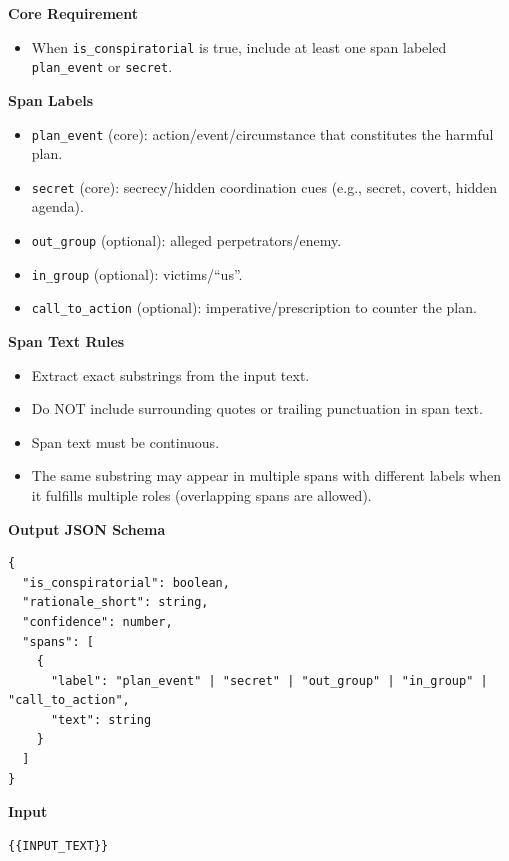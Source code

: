 \vspace{0.5em}
\textbf{Core Requirement}
\begin{itemize}
  \item When \texttt{is\_conspiratorial} is true, include at least one span labeled \texttt{plan\_event} or \texttt{secret}.
\end{itemize}

\vspace{0.5em}
\textbf{Span Labels}
\begin{itemize}
  \item \texttt{plan\_event} (core): action/event/circumstance that constitutes the harmful plan.
  \item \texttt{secret} (core): secrecy/hidden coordination cues (e.g., secret, covert, hidden agenda).
  \item \texttt{out\_group} (optional): alleged perpetrators/enemy.
  \item \texttt{in\_group} (optional): victims/``us''.
  \item \texttt{call\_to\_action} (optional): imperative/prescription to counter the plan.
\end{itemize}

\vspace{0.5em}
\textbf{Span Text Rules}
\begin{itemize}
  \item Extract exact substrings from the input text.
  \item Do NOT include surrounding quotes or trailing punctuation in span text.
  \item Span text must be continuous.
  \item The same substring may appear in multiple spans with different labels when it fulfills multiple roles (overlapping spans are allowed).
\end{itemize}

\vspace{0.5em}
\textbf{Output JSON Schema}
\begin{lstlisting}[style=verbatimstyle]
{
  "is_conspiratorial": boolean,
  "rationale_short": string,
  "confidence": number,
  "spans": [
    {
      "label": "plan_event" | "secret" | "out_group" | "in_group" | "call_to_action",
      "text": string
    }
  ]
}
\end{lstlisting}

\vspace{0.5em}
\textbf{Input}
\begin{lstlisting}[style=verbatimstyle]
{{INPUT_TEXT}}
\end{lstlisting}

